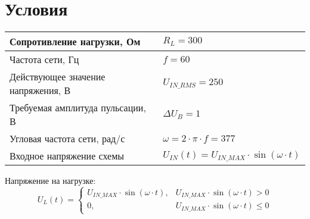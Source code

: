 \chapter{Условия}

    \begin{table}[ht]
	\begin{tabular}{|l|l|}
		\hline
		
		Сопротивление нагрузки, Ом & $R_L=300$ \\ \hline
		Частота сети, Гц & $f=60$ \\ \hline
		Действующее значение напряжения, В & $U_{IN\_RMS}=250$ \\ \hline
		Требуемая амплитуда пульсации, В & $\Delta U_B=1$ \\ \hline
		Угловая частота сети, рад/с & $\omega=2\cdot \pi \cdot f = 377$\\ \hline
		Входное напряжение схемы & $U_{IN}(t)=U_{IN\_MAX} \cdot \sin(\omega \cdot t)$ \\ \hline
	\end{tabular}
\end{table}

Напряжение на нагрузке:
\begin{equation*}
	U_L(t) = 
	\begin{cases}
		U_{IN\_MAX} \cdot \sin(\omega \cdot t), &U_{IN\_MAX} \cdot \sin(\omega \cdot t) > 0\\
		0, &U_{IN\_MAX} \cdot \sin(\omega \cdot t) \le 0
	\end{cases}
\end{equation*}